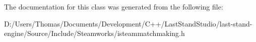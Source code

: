 The documentation for this class was generated from the following file\+:\begin{DoxyCompactItemize}
\item 
D\+:/\+Users/\+Thomas/\+Documents/\+Development/\+C++/\+Last\+Stand\+Studio/last-\/stand-\/engine/\+Source/\+Include/\+Steamworks/isteammatchmaking.\+h\end{DoxyCompactItemize}
